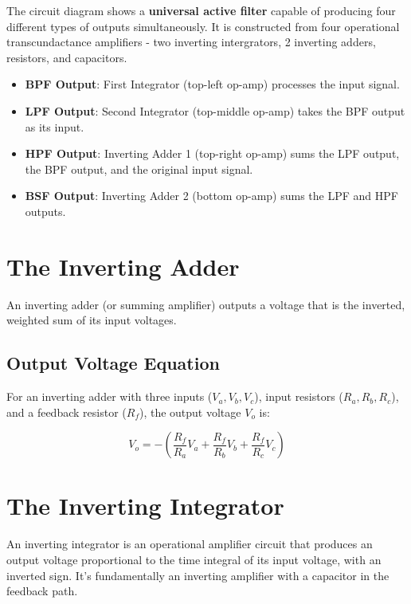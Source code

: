 \documentclass[
  letterpaper,
  DIV=11,
  numbers=noendperiod]{scrreprt}
\providecommand{\tightlist}{%
  \setlength{\itemsep}{0pt}\setlength{\parskip}{0pt}}
\begin{document}
The circuit diagram shows a \textbf{universal active filter} capable of
producing four different types of outputs simultaneously. It is
constructed from four operational transcundactance amplifiers - two
inverting intergrators, 2 inverting adders, resistors, and capacitors.

\begin{itemize}
\tightlist
\item
  \textbf{BPF Output}: First Integrator (top-left op-amp) processes the
  input signal.
\item
  \textbf{LPF Output}: Second Integrator (top-middle op-amp) takes the
  BPF output as its input.
\item
  \textbf{HPF Output}: Inverting Adder 1 (top-right op-amp) sums the LPF
  output, the BPF output, and the original input signal.
\item
  \textbf{BSF Output}: Inverting Adder 2 (bottom op-amp) sums the LPF
  and HPF outputs.
\end{itemize}

\section{The Inverting Adder}\label{the-inverting-adder}

An inverting adder (or summing amplifier) outputs a voltage that is the
inverted, weighted sum of its input voltages.

\subsection{Output Voltage Equation}\label{output-voltage-equation}

For an inverting adder with three inputs (\(V_a, V_b, V_c\)), input
resistors (\(R_a, R_b, R_c\)), and a feedback resistor (\(R_f\)), the
output voltage \(V_o\) is:

\[
V_o = - \left( \frac{R_f}{R_a}V_a + \frac{R_f}{R_b}V_b + \frac{R_f}{R_c}V_c \right)
\]

\section{The Inverting Integrator}\label{the-inverting-integrator}

An inverting integrator is an operational amplifier circuit that
produces an output voltage proportional to the time integral of its
input voltage, with an inverted sign. It's fundamentally an inverting
amplifier with a capacitor in the feedback path.
\end{document}
